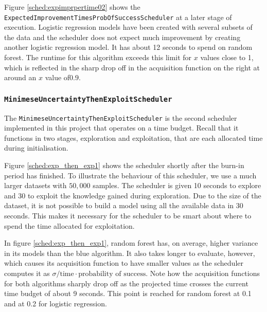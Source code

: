 \documentclass[a4paper,12pt,twoside,openright]{report}
\begin{document}
Figure \ref{sched:expimprpertime02} shows the \texttt{ExpectedImprovementTimesProbOfSuccessScheduler} at a later stage of execution. Logistic regression models have been created with several subsets of the data and the scheduler does not expect much improvement by creating another logistic regression model. It has about 12 seconds to spend on random forest. The runtime for this algorithm exceeds this limit for $x$ values close to 1, which is reflected in the sharp drop off in the acquisition function on the right at around an $x$ value of$0.9$.

\subsubsection{\texttt{MinimeseUncertaintyThenExploitScheduler}}

The \texttt{MinimeseUncertaintyThenExploitScheduler} is the second scheduler implemented in this project that operates on a time budget. Recall that it functions in two stages, exploration and exploitation, that are each allocated time during initialisation.

Figure \ref{sched:exp_then_exp1} shows the scheduler shortly after the burn-in period has finished. To illustrate the behaviour of this scheduler, we use a much larger datasets with $50,000$ samples. The scheduler is given 10 seconds to explore and 30 to exploit the knowledge gained during exploration. Due to the size of the dataset, it is not possible to build a model using all the available data in 30 seconds. This makes it necessary for the scheduler to be smart about where to spend the time allocated for exploitation.


In figure \ref{sched:exp_then_exp1}, random forest has, on average, higher variance in its models than the blue algorithm. It also takes longer to evaluate, however, which causes its acquisition function to have smaller values as the scheduler computes it as $\sigma/\text{time} \cdot \text{probability of success}$. Note how the acquisition functions for both algorithms sharply drop off as the projected time crosses the current time budget of about 9 seconds. This point is reached for random forest at 0.1 and at 0.2 for logistic regression.
\end{document}
